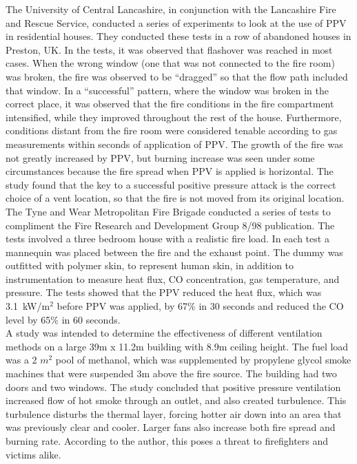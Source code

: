 \documentclass{article}
\begin{document}
The University of Central Lancashire, in conjunction with the Lancashire Fire and Rescue Service, conducted a series of experiments to look at the use of PPV in residential houses. They conducted these tests in a row of abandoned houses in Preston, UK. In the tests, it was observed that flashover was reached in most cases. When the wrong window (one that was not connected to the fire room) was broken, the fire was observed to be “dragged” so that the flow path included that window. In a “successful” pattern, where the window was broken in the correct place, it was observed that the fire conditions in the fire compartment intensified, while they improved throughout the rest of the house. Furthermore, conditions distant from the fire room were considered tenable according to gas measurements within seconds of application of PPV. The growth of the fire was not greatly increased by PPV, but burning increase was seen under some circumstances because the fire spread when PPV is applied is horizontal. The study found that the key to a successful positive pressure attack is the correct choice of a vent location, so that the fire is not moved from its original location.\cite{StottApplyingpressure}\\
	
The Tyne and Wear Metropolitan Fire Brigade conducted a series of tests to compliment the Fire Research and Development Group 8/98 publication. The tests involved a three bedroom house with a realistic fire load. In each test a mannequin was placed between the fire and the exhaust point. The dummy was outfitted with polymer skin, to represent human skin, in addition to instrumentation to measure heat flux, CO concentration, gas temperature, and pressure.  The tests showed that the PPV reduced the heat flux, which was 3.1~kW/m$^{2}$ before PPV was applied, by 67\% in 30 seconds and reduced the CO level by 65\% in 60 seconds.\cite{TTurpinBowserNatPerspective}\\
	
A study was intended to determine the effectiveness of different ventilation methods on a large 39m x 11.2m building with 8.9m ceiling height. The fuel load was a 2 $m^{2}$ pool of methanol, which was supplemented by propylene glycol smoke machines that were suspended 3m above the fire source.  The building had two doors and two windows. The study concluded that positive pressure ventilation increased flow of hot smoke through an outlet, and also created turbulence. This turbulence disturbs the thermal layer, forcing hotter air down into an area that was previously clear and cooler. Larger fans also increase both fire spread and burning rate. According to the author, this poses a threat to firefighters and victims alike.\cite{SvenssonFireVentinLargeFireHall}\\
	
\end{document}
